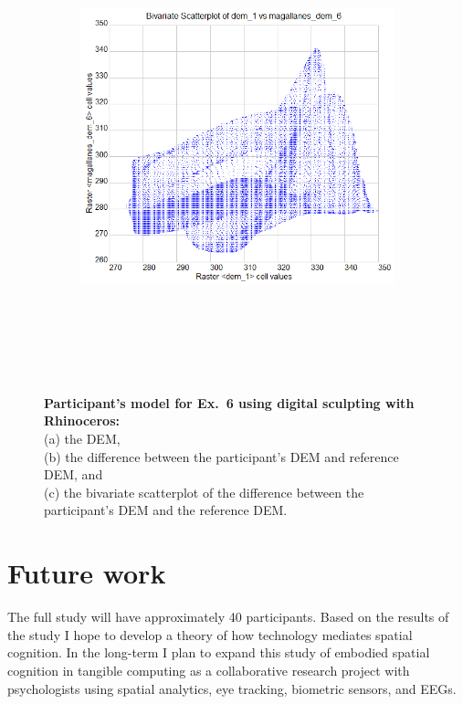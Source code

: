\documentclass{sigchi}
\begin{document}
\begin{figure}
\begin{minipage}[t]{0.33\textwidth}
\begin{subfigure}{\linewidth}
            \caption{}~\label{fig:diff_6}
        \end{subfigure}\\
        \begin{subfigure}{\linewidth}
            \centering
            \includegraphics[width=\textwidth]{figures/magallanes/magallanes_bivariate_6.png}%
            \caption{}~\label{fig:bivar_2}
        \end{subfigure}\\
        \captionsetup{width=.9\linewidth}
        \caption{\textbf{Participant's model for Ex.~6 using digital sculpting with Rhinoceros:} \\
        (a) the DEM, \\
        (b) the difference between the participant's DEM and reference DEM, and \\
        (c) the bivariate scatterplot of the difference between the participant's DEM and the reference DEM. %
        }~\label{fig:results_6}
    \end{minipage}
%
\end{figure}
%



\section{Future work}
The full study will have approximately 40 participants. 
Based on the results of the study
I hope to develop a theory 
of how technology mediates spatial cognition.
% 
In the long-term I plan to expand this study of 
embodied spatial cognition in tangible computing
as a collaborative research project with psychologists
using spatial analytics, eye tracking, biometric sensors, and EEGs.
\end{document}
